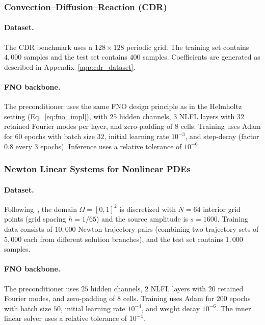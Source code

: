 \documentclass{article}
\theoremstyle{plain}
\theoremstyle{remark}
\begin{document}
\subsubsection{Convection--Diffusion--Reaction (CDR)}
\label{app:setup_cdr}

\paragraph{Dataset.}
The CDR benchmark uses a $128\times128$ periodic grid. The training set contains $4{,}000$ samples and the test set contains $400$ samples. Coefficients are generated as described in Appendix~\ref{app:cdr_dataset}.

\paragraph{FNO backbone.}
The preconditioner uses the same FNO design principle as in the Helmholtz setting (Eq.~\eqref{eq:fno_impl}), with $25$ hidden channels, $3$ NLFL layers with $32$ retained Fourier modes per layer, and zero-padding of $8$ cells. Training uses Adam for $60$ epochs with batch size $32$, initial learning rate $10^{-3}$, and step-decay (factor $0.8$ every $3$ epochs). Inference uses a relative tolerance of $10^{-6}$.

\subsubsection{Newton Linear Systems for Nonlinear PDEs}
\label{app:setup_newton}

\paragraph{Dataset.}
Following~\cite{hao2024newton}, the domain $\Omega=[0,1]^2$ is discretized with $N=64$ interior grid points (grid spacing $h=1/65$) and the source amplitude is $s=1600$. Training data consists of $10{,}000$ Newton trajectory pairs (combining two trajectory sets of $5{,}000$ each from different solution branches), and the test set contains $1{,}000$ samples.

\paragraph{FNO backbone.}
The preconditioner uses $25$ hidden channels, $2$ NLFL layers with $20$ retained Fourier modes, and zero-padding of $8$ cells. Training uses Adam for $200$ epochs with batch size $50$, initial learning rate $10^{-4}$, and weight decay $10^{-6}$. The inner linear solver uses a relative tolerance of $10^{-4}$.
\end{document}
